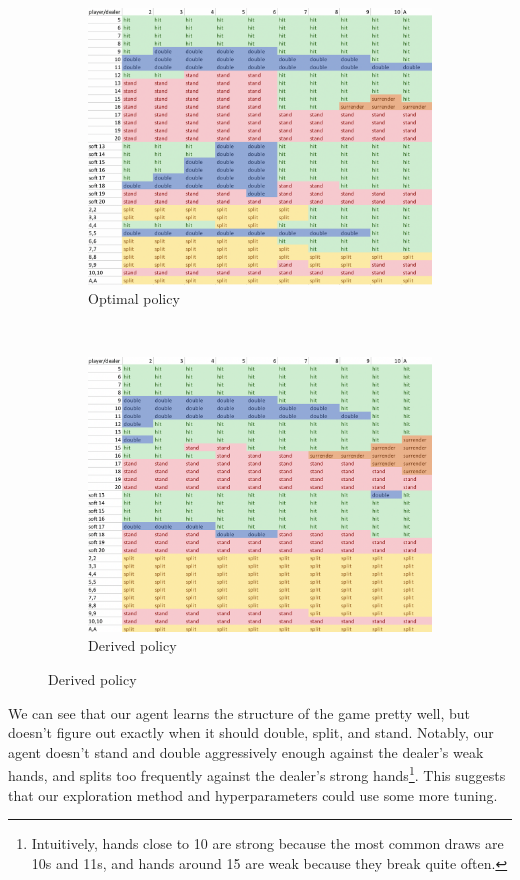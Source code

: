 \documentclass{article}
\begin{document}
\FloatBarrier
\begin{figure}[h]
	\centering
	\begin{subfigure}{0.45\textwidth}
		\includegraphics[width=\textwidth]{opt_chart}
		\caption{Optimal policy}
	\end{subfigure}
	~
	\begin{subfigure}{0.45\textwidth}
		\includegraphics[width=\textwidth]{model_chart}
		\caption{Derived policy}
	\end{subfigure}
\end{figure}
\FloatBarrier

We can see that our agent learns the structure of the game pretty well, but doesn't figure out exactly when it should double, split, and stand. Notably, our agent doesn't stand and double aggressively enough against the dealer's weak hands, and splits too frequently against the dealer's strong hands\footnote{Intuitively, hands close to 10 are strong because the most common draws are 10s and 11s, and hands around 15 are weak because they break quite often.}. This suggests that our exploration method and hyperparameters could use some more tuning. 
\end{document}
